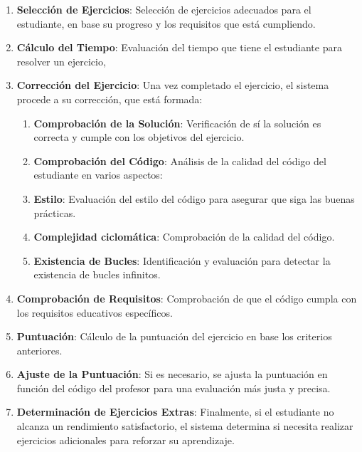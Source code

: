 \begin{enumerate}
    \item \textbf{Selección de Ejercicios}: Selección de ejercicios adecuados para el estudiante, en base su progreso y los requisitos que está cumpliendo.

    \item \textbf{Cálculo del Tiempo}: Evaluación del tiempo que tiene el estudiante para resolver un ejercicio,

    \item \textbf{Corrección del Ejercicio}: Una vez completado el ejercicio, el sistema procede a su corrección, que está formada:

    \begin{enumerate}
        \item \textbf{Comprobación de la Solución}: Verificación de sí la solución es correcta y cumple con los objetivos del ejercicio.
        \item \textbf{Comprobación del Código}: Análisis de la calidad del código del estudiante en varios aspectos:
        \item \textbf{Estilo}: Evaluación del estilo del código para asegurar que siga las buenas prácticas.
        \item \textbf{Complejidad ciclomática}: Comprobación de la calidad del código.
        \item \textbf{Existencia de Bucles}: Identificación y evaluación para detectar la existencia de bucles infinitos. 
    \end{enumerate}

    \item \textbf{Comprobación de Requisitos}: Comprobación de que el código cumpla con los requisitos educativos específicos.

    \item \textbf{Puntuación}: Cálculo de la puntuación del ejercicio en base los criterios anteriores.
    
    \item \textbf{Ajuste de la Puntuación}: Si es necesario, se ajusta la puntuación en función del código del profesor para una evaluación más justa y precisa.

    \item \textbf{Determinación de Ejercicios Extras}: Finalmente, si el estudiante no alcanza un rendimiento satisfactorio, el sistema determina si necesita realizar ejercicios adicionales para reforzar su aprendizaje.
\end{enumerate}

